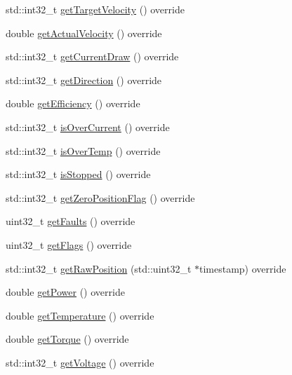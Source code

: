 \begin{DoxyCompactItemize}
std\+::int32\+\_\+t \mbox{\hyperlink{classokapi_1_1Motor_aee4697f4e1f39bc0206062d0247caf47}{get\+Target\+Velocity}} () override
\item 
double \mbox{\hyperlink{classokapi_1_1Motor_a12dab94ff8e0636c01d3c568d9461655}{get\+Actual\+Velocity}} () override
\item 
std\+::int32\+\_\+t \mbox{\hyperlink{classokapi_1_1Motor_ac5107f8aef228d4b4fec06d549c55cf6}{get\+Current\+Draw}} () override
\item 
std\+::int32\+\_\+t \mbox{\hyperlink{classokapi_1_1Motor_a72c69d60e2ec69c126c84dc81f78742d}{get\+Direction}} () override
\item 
double \mbox{\hyperlink{classokapi_1_1Motor_a7703340c95e9e7dcafa243685a7d2d50}{get\+Efficiency}} () override
\item 
std\+::int32\+\_\+t \mbox{\hyperlink{classokapi_1_1Motor_aff882cb26c477355551d7bbf8e5c03bb}{is\+Over\+Current}} () override
\item 
std\+::int32\+\_\+t \mbox{\hyperlink{classokapi_1_1Motor_a8a51f7dede42f768280b73d85a528d91}{is\+Over\+Temp}} () override
\item 
std\+::int32\+\_\+t \mbox{\hyperlink{classokapi_1_1Motor_ab4edaf8e4ed576fa2003d4cc8e02c364}{is\+Stopped}} () override
\item 
std\+::int32\+\_\+t \mbox{\hyperlink{classokapi_1_1Motor_a2640dea57e59a19aa6000da2c7cefdeb}{get\+Zero\+Position\+Flag}} () override
\item 
uint32\+\_\+t \mbox{\hyperlink{classokapi_1_1Motor_a7d16e9d0a3319a02a12476b5bec991d7}{get\+Faults}} () override
\item 
uint32\+\_\+t \mbox{\hyperlink{classokapi_1_1Motor_acb0097ba7ac778674efaa2c0765f6f3f}{get\+Flags}} () override
\item 
std\+::int32\+\_\+t \mbox{\hyperlink{classokapi_1_1Motor_a74c579c35863bc5180c9551fd5185d94}{get\+Raw\+Position}} (std\+::uint32\+\_\+t $\ast$timestamp) override
\item 
double \mbox{\hyperlink{classokapi_1_1Motor_a992171c86829e52f5418988fada0b6fa}{get\+Power}} () override
\item 
double \mbox{\hyperlink{classokapi_1_1Motor_ab5b9208b001c1ab49f8c058eff58e5b3}{get\+Temperature}} () override
\item 
double \mbox{\hyperlink{classokapi_1_1Motor_a4a8c14c49ae44d687772ff41591fdf1d}{get\+Torque}} () override
\item 
std\+::int32\+\_\+t \mbox{\hyperlink{classokapi_1_1Motor_af60eb970996183d86bd4786869f5adb0}{get\+Voltage}} () override

\end{DoxyCompactItemize}
